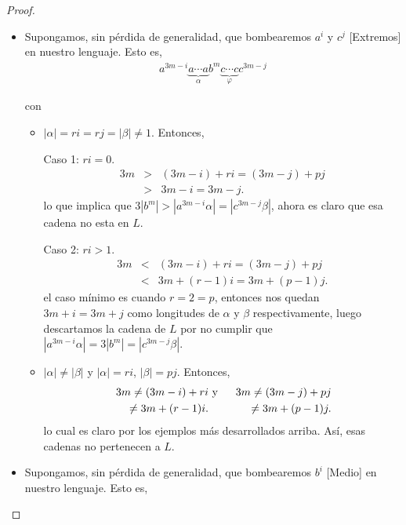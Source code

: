 \documentclass{article}
\begin{document}
\begin{enumerate}
\begin{proof}
\begin{itemize}
      \item  Supongamos, sin pérdida de generalidad, que bombearemos $a^i$ y $c^j$ [Extremos]
        en nuestro lenguaje. Esto es,
        \begin{eqnarray*}
          a^{3m - i} \underbrace{a \dotsm a}_{\alpha} b^m \underbrace{c \dotsm c}_{\varphi}c^{3m - j}
        \end{eqnarray*}
        
        \begin{center}
        \end{center}
        
        con
        \begin{itemize}
        \item $|\alpha| = ri = rj = |\beta| \neq 1$. Entonces,
          
          Caso 1: $ri = 0$.
          \begin{eqnarray*}
            3m &>& (3m - i) + ri = (3m - j) + pj\\
            &>& 3m - i = 3m - j.
          \end{eqnarray*}
          lo que implica que $3|b^m| > |a^{3m - i}\alpha| = |c^{3m - j}\beta|$, ahora es claro que esa cadena no esta en $L$.
          
          Caso 2: $ri > 1$.
          \begin{eqnarray*}
            3m &<& (3m - i) + ri = (3m - j) + pj\\
            &<& 3m + (r - 1)i = 3m + (p - 1)j.
          \end{eqnarray*}
          el caso mínimo es cuando $r = 2 = p$, entonces nos quedan $3m + i = 3m + j$ como longitudes de $\alpha$
          y $\beta$ respectivamente, luego descartamos la cadena de $L$ por no cumplir que $ |a^{3m - i}\alpha| = 3|b^m| = |c^{3m - j}\beta|$.
        \item $|\alpha| \neq |\beta|$ y $|\alpha| = ri$, $|\beta| = pj$. Entonces,
          \begin{eqnarray*}
            3m \neq (3m - i) + ri &\text{ y }& 3m \neq (3m - j) + pj\\
            \hspace{0.5cm} \neq 3m + (r - 1)i. & & \hspace*{0.6cm}\neq 3m + (p - 1)j.
          \end{eqnarray*}
          lo cual es claro por los ejemplos más desarrollados arriba. Así, esas cadenas no pertenecen
          a $L$.
        \end{itemize}
      \item Supongamos, sin pérdida de generalidad, que bombearemos $b^i$ [Medio]
        en nuestro lenguaje. Esto es,
        

\end{itemize}
\end{proof}
\end{enumerate}
\end{document}
